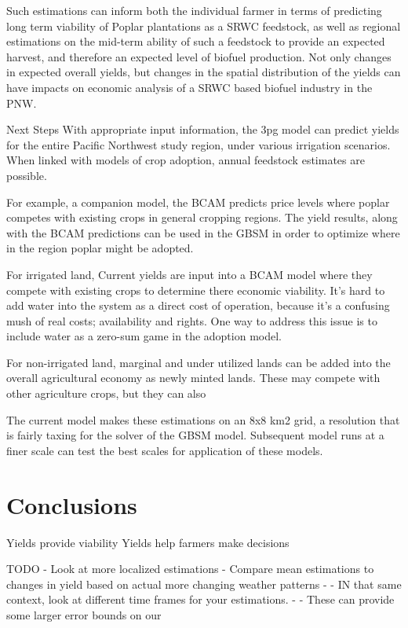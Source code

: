 \documentclass[preprint,12pt]{elsarticle}
\begin{document}
Such estimations can inform both the individual farmer in terms of
predicting long term viability of Poplar plantations as a \ac{SRWC}
feedstock, as well as regional estimations on the mid-term ability of
such a feedstock to provide an expected harvest, and therefore an
expected level of biofuel production.  Not only changes in expected
overall yields, but changes in the spatial distribution of the yields
can have impacts on economic analysis of a \ac{SRWC} based biofuel
industry in the \ac{PNW}.  

Next Steps 
With appropriate input information, the \ac{3pg} model can predict
yields for the entire Pacific Northwest study region, under various
irrigation scenarios.  When linked with models of crop adoption,
annual feedstock estimates are possible.

For example, a companion model, the \acf{BCAM} predicts price levels
where poplar competes with existing crops in general cropping regions.
The yield results, along with the \ac{BCAM} predictions can be used in
the \acf{GBSM} in order to optimize where in the region poplar might
be adopted.


For irrigated land, Current yields are input into a \ac{BCAM} model
where they compete with existing crops to determine there economic
viability.  It's hard to add water into the system as a direct cost of
operation, because it's a confusing mush of real costs; availability
and rights.  One way to address this issue is to include water as a
zero-sum game in the adoption model.

For non-irrigated land, marginal and under utilized lands can be
added into the overall agricultural economy as newly minted lands.
These may compete with other agriculture crops, but they can also 

The current model makes these estimations on an 8x8 km2 grid, a
resolution that is fairly taxing for the solver of the \ac{GBSM}
model.  Subsequent model runs at a finer scale can test the best
scales for application of these models.


\section{Conclusions}
\label{sec:conclude}

Yields provide viability
Yields help farmers make decisions

TODO
- Look at more localized estimations
- Compare mean estimations to changes in yield based on actual more changing weather patterns
- - IN that same context, look at different time frames for your estimations. 
- - These can provide some larger error bounds on our 
\end{document}

